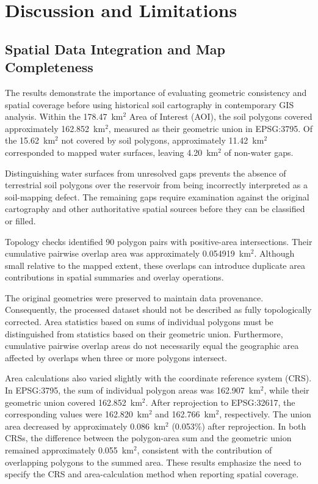 \section{Discussion and Limitations}
\label{sec:discussion}

\subsection{Spatial Data Integration and Map Completeness}

The results demonstrate the importance of evaluating
geometric consistency and spatial coverage before using
historical soil cartography in contemporary GIS analysis.
Within the 178.47~km$^2$ Area of Interest (AOI), the
soil polygons covered approximately 162.852~km$^2$,
measured as their geometric union in EPSG:3795.
Of the 15.62~km$^2$ not covered by soil polygons,
approximately 11.42~km$^2$ corresponded to mapped
water surfaces, leaving 4.20~km$^2$ of non-water gaps.

Distinguishing water surfaces from unresolved gaps
prevents the absence of terrestrial soil polygons
over the reservoir from being incorrectly interpreted
as a soil-mapping defect. The remaining gaps require
examination against the original cartography and
other authoritative spatial sources before they
can be classified or filled.

Topology checks identified 90 polygon pairs with
positive-area intersections. Their cumulative
pairwise overlap area was approximately
0.054919~km$^2$. Although small relative to the
mapped extent, these overlaps can introduce
duplicate area contributions in spatial summaries
and overlay operations.

The original geometries were preserved to maintain
data provenance. Consequently, the processed dataset
should not be described as fully topologically
corrected. Area statistics based on sums of individual
polygons must be distinguished from statistics based
on their geometric union. Furthermore, cumulative
pairwise overlap areas do not necessarily equal the
geographic area affected by overlaps when three or
more polygons intersect.

Area calculations also varied slightly with the
coordinate reference system (CRS). In EPSG:3795,
the sum of individual polygon areas was
162.907~km$^2$, while their geometric union covered
162.852~km$^2$. After reprojection to EPSG:32617,
the corresponding values were 162.820~km$^2$
and 162.766~km$^2$, respectively. The union area
decreased by approximately 0.086~km$^2$
(0.053\%) after reprojection. In both CRSs,
the difference between the polygon-area sum and
the geometric union remained approximately
0.055~km$^2$, consistent with the contribution
of overlapping polygons to the summed area.
These results emphasize the need to specify the
CRS and area-calculation method when reporting
spatial coverage.

